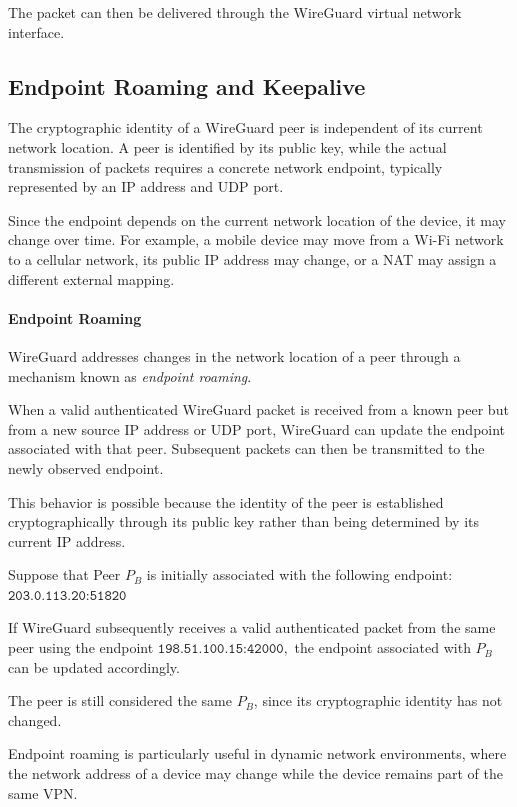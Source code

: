The packet can then be delivered through the WireGuard virtual network interface.

\subsection{Endpoint Roaming and Keepalive}

The cryptographic identity of a WireGuard peer is independent of its current network location. A peer is identified by its public key, while the actual transmission of packets requires a concrete network endpoint, typically represented by an IP address and UDP port.

Since the endpoint depends on the current network location of the device, it may change over time. For example, a mobile device may move from a Wi-Fi network to a cellular network, its public IP address may change, or a NAT may assign a different external mapping.

\paragraph{Endpoint Roaming}
WireGuard addresses changes in the network location of a peer through a mechanism known as \textit{endpoint roaming}.

When a valid authenticated WireGuard packet is received from a known peer but from a new source IP address or UDP port, WireGuard can update the endpoint associated with that peer. Subsequent packets can then be transmitted to the newly observed endpoint.

This behavior is possible because the identity of the peer is established cryptographically through its public key rather than being determined by its current IP address.

\begin{example}
	Suppose that Peer \(P_B\) is initially associated with the following endpoint: \(\texttt{203.0.113.20:51820} \)

	If WireGuard subsequently receives a valid authenticated packet from the same peer using the endpoint \(\texttt{198.51.100.15:42000},\) the endpoint associated with \(P_B\) can be updated accordingly.

	The peer is still considered the same \(P_B\), since its cryptographic identity has not changed.
\end{example}

Endpoint roaming is particularly useful in dynamic network environments, where the network address of a device may change while the device remains part of the same VPN.

